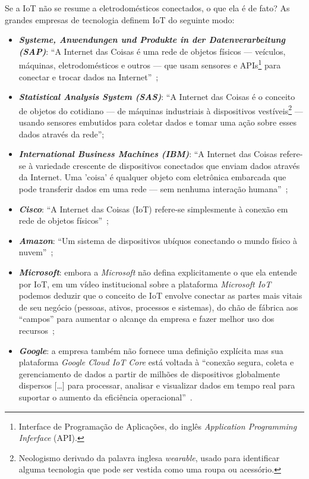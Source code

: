 \documentclass[pdftex, brazil, 12pt, twoside]{article}
\newcommand{\ingles}[1]{\textit{#1}}
\begin{document}
Se a IoT não se resume a eletrodomésticos conectados, o que ela é de fato? As
grandes empresas de tecnologia definem IoT do seguinte modo:

\begin{itemize}
\item \emph{\textbf{Systeme, Anwendungen und Produkte in der Datenverarbeitung (SAP)}}:
  ``A Internet das Coisas é uma rede de objetos físicos --- veículos,
  máquinas, eletrodomésticos e outros --- que usam sensores e APIs\footnote{%
    Interface de Programação de Aplicações, do inglês \ingles{Application Programming
    Inferface} (API).}
  para conectar e trocar dados na Internet''~\citep{SAPWhatIoT};
\item \emph{\textbf{Statistical Analysis System (SAS)}}: ``A Internet das Coisas é o
  conceito de objetos do cotidiano --- de
  máquinas industriais à dispositivos vestíveis\footnote{%
    Neologismo derivado da palavra inglesa \ingles{wearable}, usado para identificar
    alguma tecnologia que pode ser vestida como uma roupa ou acessório.}
  --- usando sensores embutidos para coletar
  dados e tomar uma ação sobre esses dados através da rede''\citep{SASWhatIoT};
\item \emph{\textbf{International Business Machines (IBM)}}: ``A Internet das Coisas
  refere-se à variedade crescente
  de dispositivos conectados que enviam dados através da Internet. Uma 'coisa' é qualquer
  objeto com eletrônica embarcada que pode transferir dados em uma rede --- sem nenhuma
  interação humana''~\citep{IBMWhatIsIoT,IBMWhatsonIoT};
\item \emph{\textbf{Cisco}}: ``A Internet das Coisas (IoT) refere-se simplesmente à conexão
  em rede de objetos físicos''~\citep{CiscoIoTVS2013};
\item \emph{\textbf{Amazon}}: ``Um sistema de dispositivos ubíquos conectando o mundo
  físico à nuvem''~\citep{AmazonIoT};
\item \emph{\textbf{Microsoft}}: embora a \ingles{Microsoft} não defina explicitamente o que
  ela entende por IoT, em um vídeo institucional sobre a plataforma \emph{Microsoft IoT}
  podemos deduzir que o conceito de IoT envolve conectar as partes mais vitais de
  seu negócio (pessoas, ativos, processos e sistemas), do chão de fábrica aos ``campos''
  para aumentar o alcançe da empresa e fazer melhor uso dos recursos~\citep{MicrosoftIoT};
\item \emph{\textbf{Google}}: a empresa também não fornece uma definição explícita mas
  sua plataforma \emph{Google Cloud IoT Core} está voltada à ``conexão segura, coleta e
  gerenciamento de dados a partir de milhões de dispositivos globalmente dispersos [\ldots]
  para processar, analisar e visualizar dados em tempo real para suportar o aumento
  da eficiência operacional''~\citep{GoogleWhatsIoT}.
\end{itemize}
\end{document}
